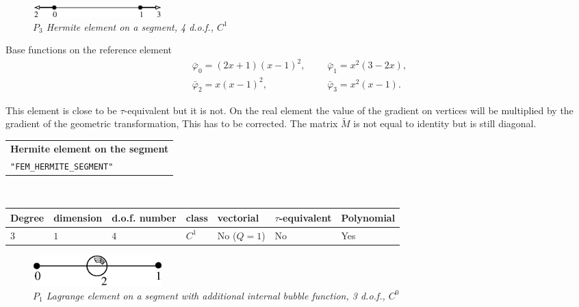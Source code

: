 \documentclass[11pt,a4paper]{article}
\begin{document}
\begin{figure}[H]
  \begin{center}
    \includegraphics[width=5cm,angle=0]{getfemlist_segment_hermite.eps}
  \end{center}
  \caption{ \it $P_3$ Hermite element on a segment, 4 d.o.f., $C^1$} 
  \label{fig:segment_hermite}
\end{figure}

Base functions on the reference element
\begin{eqnarray*}
 \bar{\varphi}_0 = (2x+1)(x-1)^2,&&\ \ \ \bar{\varphi}_1 = x^2(3-2x), \\
 \bar{\varphi}_2 = x(x-1)^2,&& \ \ \ \bar{\varphi}_3 = x^2(x - 1). 
\end{eqnarray*}

This element is close to be \mbox{$\tau$-equivalent} but it is not. On the real element the value of the gradient on vertices will be multiplied by the gradient of the geometric transformation, This has to be corrected. The matrix $\tilde{M}$ is not equal to identity but is still diagonal.

\begin{center}
\begin{tabular}{|m{16.11cm}|} \hline 
{\bf Hermite element on the segment}\\
{\tt "FEM\_HERMITE\_SEGMENT"}
\end{tabular} \\ \vspace{-1pt} 
\begin{tabular}{|m{2cm}|m{2cm}|m{2.5cm}|m{1.2cm}|m{2cm}|m{2cm}|m{1.8cm}|} \hline 
Degree & dimension & d.o.f. number & class & vectorial & \mbox{$\tau$-equivalent} & Polynomial\\ \hline
$3$ & $1$ & $4$ & $C^1$ & No \mbox{($Q = 1$)} & No & Yes\\ \hline
\end{tabular}
\end{center}

\begin{figure}[H]
  \begin{center}
    \includegraphics[width=5cm,angle=0]{getfemlist_segment_bubble.eps}
  \end{center}
  \caption{ \it $P_1$ Lagrange element on a segment with additional internal bubble function, 3 d.o.f., $C^0$} 
  \label{fig:segment_bubble}
\end{figure}
\end{document}
